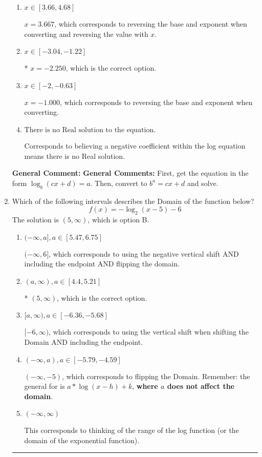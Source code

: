 \documentclass{extbook}[14pt]
\newcommand{\litem}[1]{\item #1

\rule{\textwidth}{0.4pt}}
\begin{document}
\begin{enumerate}
{\begin{enumerate}[label=\Alph*.]
$x = 0.333$, which corresponds to ignoring the vertical shift when converting to exponential form.
\item \( x \in [3.66, 4.68] \)

$x = 3.667$, which corresponds to reversing the base and exponent when converting and reversing the value with $x$.
\item \( x \in [-3.04, -1.22] \)

* $x = -2.250$, which is the correct option.
\item \( x \in [-2, -0.63] \)

$x = -1.000$, which corresponds to reversing the base and exponent when converting.
\item \( \text{There is no Real solution to the equation.} \)

Corresponds to believing a negative coefficient within the log equation means there is no Real solution.
\end{enumerate}

\textbf{General Comment:} \textbf{General Comments:} First, get the equation in the form $\log_b{(cx+d)} = a$. Then, convert to $b^a = cx+d$ and solve.
}
\litem{
Which of the following intervals describes the Domain of the function below?
\[ f(x) = -\log_2{(x-5)}-6 \]
The solution is \( (5, \infty) \), which is option B.\begin{enumerate}[label=\Alph*.]
\item \( (-\infty, a], a \in [5.47, 6.75] \)

$(-\infty, 6]$, which corresponds to using the negative vertical shift AND including the endpoint AND flipping the domain.
\item \( (a, \infty), a \in [4.4, 5.21] \)

* $(5, \infty)$, which is the correct option.
\item \( [a, \infty), a \in [-6.36, -5.68] \)

$[-6, \infty)$, which corresponds to using the vertical shift when shifting the Domain AND including the endpoint.
\item \( (-\infty, a), a \in [-5.79, -4.59] \)

$(-\infty, -5)$, which corresponds to flipping the Domain. Remember: the general for is $a*\log(x-h)+k$, \textbf{where $a$ does not affect the domain}.
\item \( (-\infty, \infty) \)

This corresponds to thinking of the range of the log function (or the domain of the exponential function).
\end{enumerate}

}
\end{enumerate}
\end{document}
